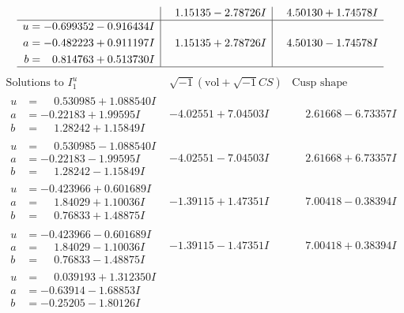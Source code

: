 \documentclass[1p]{elsarticle_modified}
\theoremstyle{definition}
\newcommand{\I}{\sqrt{-1}}
\begin{document}
$$\begin{array}{c|c|c}
 & \phantom{-}1.15135 - 2.78726 I & \phantom{-}4.50130 + 1.74578 I \\ \hline\begin{aligned}
u &= -0.699352 - 0.916434 I \\
a &= -0.482223 + 0.911197 I \\
b &= \phantom{-}0.814763 + 0.513730 I\end{aligned}
 & \phantom{-}1.15135 + 2.78726 I & \phantom{-}4.50130 - 1.74578 I\\
 \hline 
 \end{array}$$\newpage$$\begin{array}{c|c|c}  
\text{Solutions to }I^u_{1}& \I (\text{vol} + \sqrt{-1}CS) & \text{Cusp shape}\\
 \hline 
\begin{aligned}
u &= \phantom{-}0.530985 + 1.088540 I \\
a &= -0.22183 + 1.99595 I \\
b &= \phantom{-}1.28242 + 1.15849 I\end{aligned}
 & -4.02551 + 7.04503 I & \phantom{-}2.61668 - 6.73357 I \\ \hline\begin{aligned}
u &= \phantom{-}0.530985 - 1.088540 I \\
a &= -0.22183 - 1.99595 I \\
b &= \phantom{-}1.28242 - 1.15849 I\end{aligned}
 & -4.02551 - 7.04503 I & \phantom{-}2.61668 + 6.73357 I \\ \hline\begin{aligned}
u &= -0.423966 + 0.601689 I \\
a &= \phantom{-}1.84029 + 1.10036 I \\
b &= \phantom{-}0.76833 + 1.48875 I\end{aligned}
 & -1.39115 + 1.47351 I & \phantom{-}7.00418 - 0.38394 I \\ \hline\begin{aligned}
u &= -0.423966 - 0.601689 I \\
a &= \phantom{-}1.84029 - 1.10036 I \\
b &= \phantom{-}0.76833 - 1.48875 I\end{aligned}
 & -1.39115 - 1.47351 I & \phantom{-}7.00418 + 0.38394 I \\ \hline\begin{aligned}
u &= \phantom{-}0.039193 + 1.312350 I \\
a &= -0.63914 - 1.68853 I \\
b &= -0.25205 - 1.80126 I\end{aligned}

\end{array}$$
\end{document}
